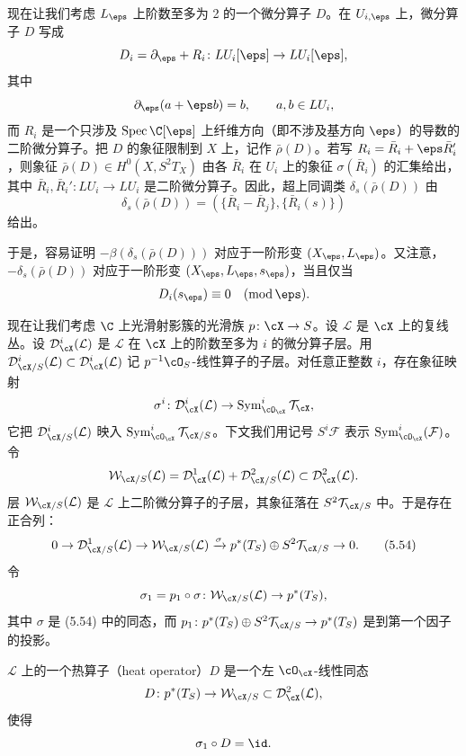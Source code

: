 现在让我们考虑 $L_\eps$ 上阶数至多为 2 的一个微分算子 $D$。在 $U_{i,\eps}$ 上，微分算子 $D$ 写成
\[
 D_i=\partial_\eps+R_i\colon LU_i[\eps]\to LU_i[\eps],
\]
其中
\[
 \partial_\eps(a+\eps b)=b,\qquad a,b\in LU_i,
\]
而 $R_i$ 是一个只涉及 $\operatorname{Spec}\C[\eps]$ 上纤维方向（即不涉及基方向 $\eps$）的导数的二阶微分算子。把 $D$ 的象征限制到 $X$ 上，记作 $\bar\rho(D)$。若写 $R_i=\bar R_i+\eps\bar R_i'$，则象征 $\bar\rho(D)\in H^0(X,S^2T_X)$ 由各 $\bar R_i$ 在 $U_i$ 上的象征 $\sigma(\bar R_i)$ 的汇集给出，其中 $\bar R_i,\bar R_i'\colon LU_i\to LU_i$ 是二阶微分算子。因此，超上同调类 $\delta_s(\bar\rho(D))$ 由
\[
 \delta_s(\bar\rho(D))=(\{\bar R_i-\bar R_j\},\{\bar R_i(s)\})
\]
给出。


于是，容易证明 $-\beta(\delta_s(\bar\rho(D)))$ 对应于一阶形变 $(X_\eps,L_\eps)$。又注意，$-\delta_s(\bar\rho(D))$ 对应于一阶形变 $(X_\eps,L_\eps,s_\eps)$，当且仅当
\[
 D_i(s_\eps)\equiv0\quad(\operatorname{mod}\eps).
\]

现在让我们考虑 $\C$ 上光滑射影簇的光滑族 $p\colon\cX\to S$。设 $\mathcal L$ 是 $\cX$ 上的复线丛。设 $\mathcal D_{\cX}^i(\mathcal L)$ 是 $\mathcal L$ 在 $\cX$ 上的阶数至多为 $i$ 的微分算子层。用 $\mathcal D_{\cX/S}^i(\mathcal L)\subset\mathcal D_{\cX}^i(\mathcal L)$ 记 $p^{-1}\cO_S$-线性算子的子层。对任意正整数 $i$，存在象征映射
\[
 \sigma^i\colon\mathcal D_{\cX}^i(\mathcal L)\to\operatorname{Sym}^i_{\cO_{\cX}}\mathcal T_{\cX},
\]
它把 $\mathcal D_{\cX/S}^i(\mathcal L)$ 映入 $\operatorname{Sym}^i_{\cO_{\cX}}\mathcal T_{\cX/S}$。下文我们用记号 $S^i\mathcal F$ 表示 $\operatorname{Sym}^i_{\cO_{\cX}}(\mathcal F)$。令
\[
 \mathcal W_{\cX/S}(\mathcal L)=\mathcal D_{\cX}^1(\mathcal L)+\mathcal D_{\cX/S}^2(\mathcal L)\subset\mathcal D_{\cX}^2(\mathcal L).
\]
层 $\mathcal W_{\cX/S}(\mathcal L)$ 是 $\mathcal L$ 上二阶微分算子的子层，其象征落在 $S^2\mathcal T_{\cX/S}$ 中。于是存在正合列：
\begin{equation}
 0\to\mathcal D_{\cX/S}^1(\mathcal L)\to\mathcal W_{\cX/S}(\mathcal L)\xrightarrow{\sigma}p^*(T_S)\oplus S^2\mathcal T_{\cX/S}\to0. \tag{5.54}
\end{equation}
令
\[
 \sigma_1=p_1\circ\sigma\colon\mathcal W_{\cX/S}(\mathcal L)\to p^*(T_S),
\]
其中 $\sigma$ 是 (5.54) 中的同态，而 $p_1\colon p^*(T_S)\oplus S^2\mathcal T_{\cX/S}\to p^*(T_S)$ 是到第一个因子的投影。


\begin{definition}[5.28]
$\mathcal L$ 上的一个热算子（heat operator）$D$ 是一个左 $\cO_{\cX}$-线性同态
\[
 D\colon p^*(T_S)\to\mathcal W_{\cX/S}\subset\mathcal D_{\cX}^2(\mathcal L),
\]
使得
\[
 \sigma_1\circ D=\id.
\]
\end{definition}

